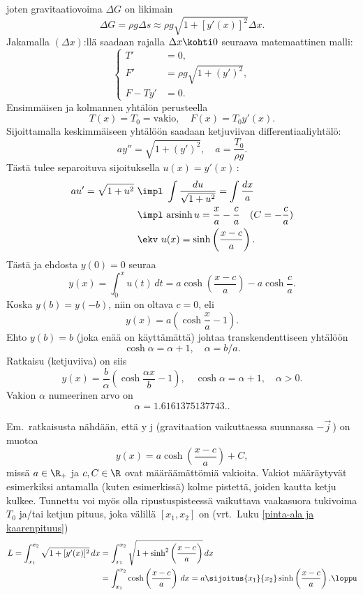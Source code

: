 joten gravitaatiovoima $\Delta G$ on likimain
\[
\Delta G=\rho g \Delta s \approx \rho g \sqrt{1+[y'(x)]^2} \Delta x.
\]
Jakamalla $(\Delta x)$:llä saadaan rajalla $\Delta x\kohti 0$ seuraava matemaattinen malli:
\[
\left\{ \begin{aligned}
T' &= 0, \\
F' &= \rho g \sqrt{1+(y')^2}, \\
F-Ty' &= 0.
\end{aligned} \right.
\]
Ensimmäisen ja kolmannen yhtälön perusteella
\[
T(x)=T_0=\text{vakio},\quad F(x)=T_0 y'(x).
\]
Sijoittamalla keskimmäiseen yhtälöön saadaan ketjuviivan differentiaaliyhtälö:
\[
ay''=\sqrt{1+(y')^2},\quad a=\frac{T_0}{\rho g}.
\]
Tästä tulee separoituva sijoituksella $u(x)=y'(x)\,$:
\begin{align*}
au'=\sqrt{1+u^2}\ &\impl\ \int\frac{du}{\sqrt{1+u^2}}=\int\frac{dx}{a} \\
                  &\impl\ \text{arsinh} \, u = \frac{x}{a}-\frac{c}{a}\quad (C=-\frac{c}{a}) \\
                  &\ekv\ u(x) = \sinh \left(\frac{x-c}{a}\right).
\end{align*}
Tästä ja ehdosta $y(0)=0$ seuraa
\[
y(x)=\int_0^x u(t)\,dt = a\cosh \left(\frac{x-c}{a}\right)-a\cosh\frac{c}{a}.
\]
Koska $y(b)=y(-b)$, niin on oltava $c=0$, eli
\[
y(x)=a\left(\cosh\frac{x}{a}-1\right).
\]
Ehto $y(b)=b$ (joka enää on käyttämättä) johtaa transkendenttiseen yhtälöön
\[
\cosh \alpha =\alpha +1,\quad \alpha=b/a.
\]
Ratkaisu (ketjuviiva) on siis
\[
y(x)=\frac{b}{\alpha}\left(\cosh\frac{\alpha x}{b}-1\right),\quad 
                                          \cosh \alpha=\alpha+1, \quad \alpha>0.
\]
Vakion $\alpha$ numeerinen arvo on
\[
\alpha=1.6161375137743..
\]

Em.\ ratkaisusta nähdään, että y j (gravitaation 
vaikuttaessa suunnassa $-\vec j\,$) on muotoa
\[
y(x) = a\cosh\left(\frac{x-c}{a}\right)+C,
\]
missä $a\in\R_+$ ja $c,C\in\R$ ovat määräämättömiä vakioita. Vakiot määräytyvät esimerkiksi
antamalla (kuten esimerkissä) kolme pistettä, joiden kautta ketju kulkee. Tunnettu voi myös
olla ripustuspisteessä vaikuttava vaakasuora tukivoima $T_0$ ja/tai ketjun pituus, joka välillä
$[x_1,x_2]$ on (vrt.\ Luku \ref{pinta-ala ja kaarenpituus})
\begin{align*}
L= \int_{x_1}^{x_2}\sqrt{1+[y'(x)]^2}\,dx 
                &= \int_{x_1}^{x_2}\sqrt{1+\sinh^2\left(\frac{x-c}{a}\right)}\,dx \\
                &= \int_{x_1}^{x_2}\cosh\left(\frac{x-c}{a}\right)\,dx 
                               = a\sijoitus{x_1}{x_2}\sinh\left(\frac{x-c}{a}\right). \loppu
\end{align*}

